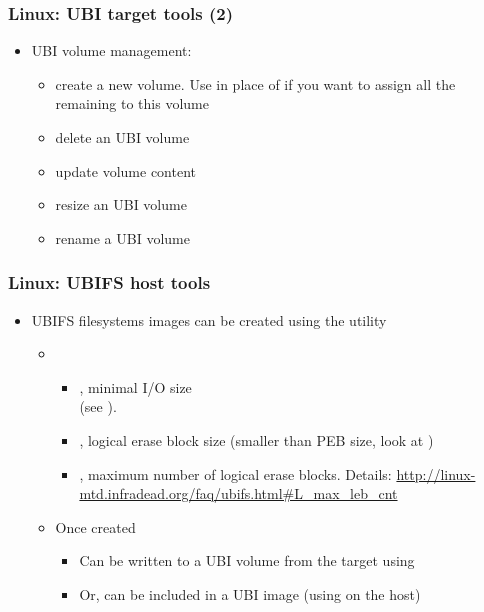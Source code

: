 \begin{frame}
  \frametitle{Linux: UBI target tools (2)}
  \begin{itemize}
  \item UBI volume management:
    \begin{itemize}
    \item {} create
      a new volume. Use  in place of  if you want
      to assign all the remaining to this volume
    \item {} delete an UBI
      volume
    \item {}
      update volume content
    \item {}
      resize an UBI volume
    \item {}
      rename a UBI volume
    \end{itemize}
  \end{itemize}
\end{frame}

\begin{frame}
  \frametitle{Linux: UBIFS host tools}
  \begin{itemize}
  \item UBIFS filesystems images can be created using the
     utility
    \begin{itemize}
    \item {}
      \begin{itemize}
      \item {}, minimal I/O size\\
                 (see ).
      \item {}, logical erase block size (smaller than
                 PEB size, look at )
      \item {}, maximum number of logical erase
        blocks. Details:
        {\tiny\url{http://linux-mtd.infradead.org/faq/ubifs.html\#L_max_leb_cnt}}
      \end{itemize}
    \item Once created
      \begin{itemize}
      \item Can be written to a UBI volume from the target using
      \item Or, can be included in a UBI image (using 
        on the host)
      \end{itemize}
    \end{itemize}
  \end{itemize}
\end{frame}


